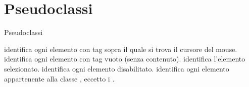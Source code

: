 \section{Pseudoclassi}

\begin{frame}[fragile]{Pseudoclassi}\transfade\centering
  \begin{description}[<+->]
     identifica ogni elemento con tag  sopra il quale si trova il cursore del mouse.
     identifica ogni elemento con tag  vuoto (senza contenuto).
     identifica l'elemento  selezionato.
     identifica ogni elemento  disabilitato.
     identifica ogni elemento appartenente alla classe , eccetto i .
    \itemtt[\dots]
  \end{description}
\end{frame}


